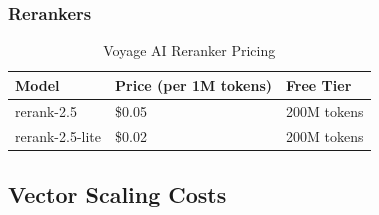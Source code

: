 \subsubsection{Rerankers}
\begin{table}[ht]
\centering
\begin{tabular}{|l|l|l|}
\hline
\textbf{Model} & \textbf{Price (per 1M tokens)} & \textbf{Free Tier} \\ \hline
rerank-2.5 & \$0.05 & 200M tokens \\ \hline
rerank-2.5-lite & \$0.02 & 200M tokens \\ \hline
\end{tabular}
\caption{Voyage AI Reranker Pricing}
\end{table}

\subsection{Vector Scaling Costs}

